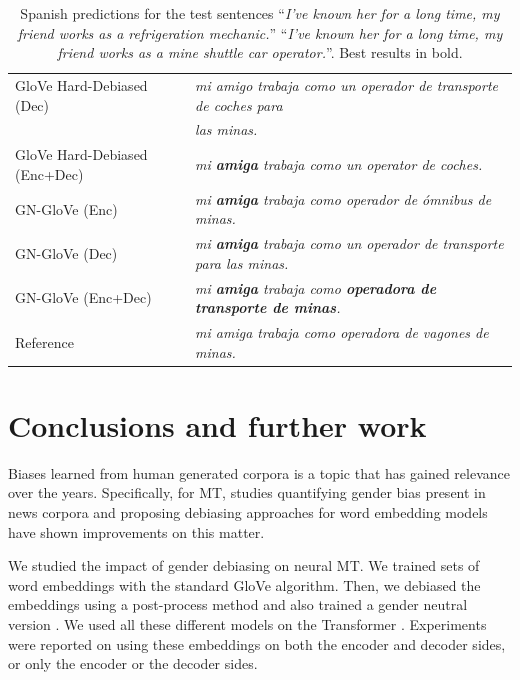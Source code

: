 \documentclass[11pt,a4paper]{article}
\begin{document}
\begin{table}[h!]
\begin{tabular}{ll}
GloVe Hard-Debiased (Dec) & \textit{mi amigo trabaja como un operador de transporte de coches para} \\
& \textit{las minas.} \\
GloVe Hard-Debiased (Enc+Dec) & \textit{mi \textbf{amiga} trabaja como un operator de coches.} \\
GN-GloVe (Enc) & \textit{mi \textbf{amiga} trabaja como operador de ómnibus de minas.} \\
GN-GloVe (Dec) & \textit{mi \textbf{amiga} trabaja como un operador de transporte para las minas.} \\
GN-GloVe (Enc+Dec) & \textit{mi \textbf{amiga} trabaja como \textbf{operadora de transporte de minas}.} \\
\midrule
Reference & \textit{mi amiga trabaja como operadora de vagones de minas.} \\
\bottomrule
\end{tabular}
\caption{\label{tab:pred-operator} 
Spanish predictions for the test sentences ``\textit{I've known her for a long time, my friend works as a refrigeration mechanic.}''
``\textit{I've known her for a long time, my friend works as a mine shuttle car operator.}''.
Best results in bold.
}
\end{table}



\section{Conclusions and further work}
\label{sec:conclusion}


Biases learned from human generated corpora is a topic that has gained relevance over the years. Specifically, for MT, studies quantifying gender bias present in news corpora and proposing debiasing approaches for word embedding models have shown improvements on this matter.

We studied the impact of gender debiasing on neural MT. We trained sets of word embeddings with the standard GloVe algorithm. Then, we debiased the embeddings using a post-process method \cite{bolukbasi2016} and also trained a gender neutral version \cite{DBLP:conf/emnlp/ZhaoZLWC18}. We used all these different models on the Transformer \cite{vaswani2017}. Experiments were reported on using these embeddings on both the encoder and decoder sides, or only the encoder or the decoder sides. 
\end{document}

